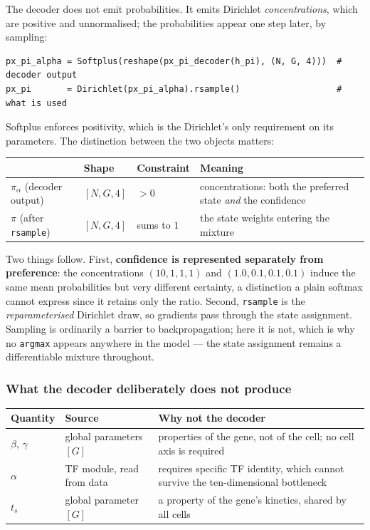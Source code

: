 \documentclass[11pt,a4paper]{article}
\newcommand{\ts}{t_{s}}
\theoremstyle{definition}
\begin{document}
The decoder does not emit probabilities. It emits Dirichlet
\emph{concentrations}, which are positive and unnormalised; the probabilities
appear one step later, by sampling:

\begin{lstlisting}
px_pi_alpha = Softplus(reshape(px_pi_decoder(h_pi), (N, G, 4)))  # decoder output
px_pi       = Dirichlet(px_pi_alpha).rsample()                   # what is used
\end{lstlisting}

Softplus enforces positivity, which is the Dirichlet's only requirement on its
parameters. The distinction between the two objects matters:

\begin{center}
\begin{tabular}{@{}lllp{5.6cm}@{}}
\toprule
& \textbf{Shape} & \textbf{Constraint} & \textbf{Meaning} \\
\midrule
$\pi_\alpha$ (decoder output) & $[N,G,4]$ & $>0$ & concentrations: both the preferred state \emph{and} the confidence \\
$\pi$ (after \texttt{rsample}) & $[N,G,4]$ & sums to $1$ & the state weights entering the mixture \\
\bottomrule
\end{tabular}
\end{center}

Two things follow. First, \textbf{confidence is represented separately from
preference}: the concentrations $(10,1,1,1)$ and $(1.0,0.1,0.1,0.1)$ induce the
same mean probabilities but very different certainty, a distinction a plain
softmax cannot express since it retains only the ratio. Second,
\texttt{rsample} is the \emph{reparameterised} Dirichlet draw, so gradients pass
through the state assignment. Sampling is ordinarily a barrier to
backpropagation; here it is not, which is why no \texttt{argmax} appears
anywhere in the model --- the state assignment remains a differentiable mixture
throughout.

\subsubsection{What the decoder deliberately does not produce}

\begin{center}
\begin{tabular}{@{}llp{6.4cm}@{}}
\toprule
\textbf{Quantity} & \textbf{Source} & \textbf{Why not the decoder} \\
\midrule
$\beta$, $\gamma$ & global parameters $[G]$ & properties of the gene, not of the cell; no cell axis is required \\
$\alpha$ & TF module, read from data & requires specific TF identity, which cannot survive the ten-dimensional bottleneck \\
$\ts$ & global parameter $[G]$ & a property of the gene's kinetics, shared by all cells \\
\bottomrule
\end{tabular}
\end{center}
\end{document}

